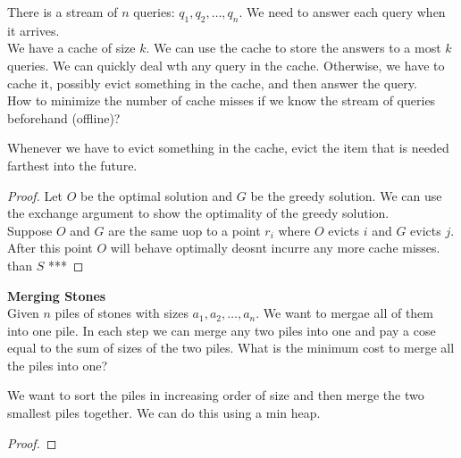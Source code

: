 \documentclass[answers,12pt,addpoints]{exam}
\begin{document}
\begin{questions}
There is a stream of $n$ queries: $q_1, q_2, \dots, q_n$. We need to answer each query when it arrives.\\
We have a cache of size $k$. We can use the cache to store the answers to a most $k$ queries. We can quickly deal wth any query in the cache. Otherwise, we have to cache it, possibly evict something in the cache, and then answer the query.\\
How to minimize the number of cache misses if we know the stream of queries beforehand (offline)?
\begin{solution}
    Whenever we have to evict something in the cache, evict the item that is needed farthest into the future. 
    \begin{proof}
        Let $O$ be the optimal solution and $G$ be the greedy solution. We can use the exchange argument to show the optimality of the greedy solution.\\
        Suppose $O$ and $G$ are the same uop to a point $r_i$ where $O$ evicts $i$ and $G$ evicts $j$. After this point $O$ will behave optimally deosnt incurre any more cache misses. than $S$ ***
    \end{proof}
\end{solution}
\question\textbf{Merging Stones}\\
Given $n$ piles of stones with sizes $a_1, a_2, \dots, a_n$. We want to mergae all of them into one pile. In each step we can merge any two piles into one and pay a cose equal to the sum of sizes of the two piles. What is the minimum cost to merge all the piles into one?
\begin{solution}
    We want to sort the piles in increasing order of size and then merge the two smallest piles together. We can do this using a min heap.
    \begin{proof}
        
    \end{proof}
\end{solution}


\end{questions}
\end{document}
